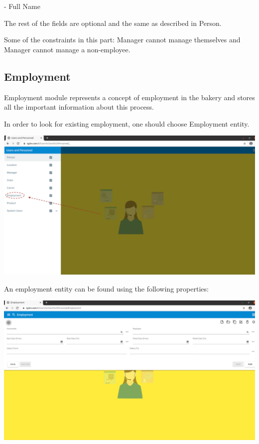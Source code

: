 - Full Name

The rest of the fields are optional and the same as described in Person.

Some of the constraints in this part: Manager cannot manage themselves and Manager cannot manage a non-employee.

\subsection{Employment}

Employment module represents a concept of employment in the bakery and stores all the important information about this process.

In order to look for existing employment, one should choose Employment entity.

\includegraphics[width=\textwidth]{sections/01-chapter/images/employment1.png}

An employment entity can be found using the following properties:

\includegraphics[width=\textwidth]{sections/01-chapter/images/employment2.png}


